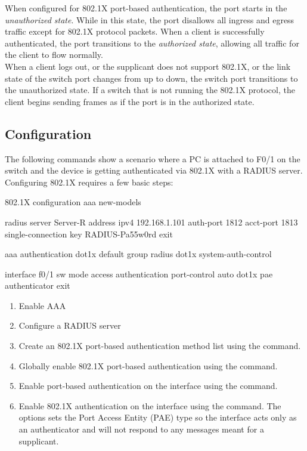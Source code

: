 When configured for 802.1X port-based authentication, the port starts in the \emph{unauthorized state}. While in this state, the port disallows all ingress and egress traffic except for 802.1X protocol packets. When a client is successfully authenticated, the port transitions to the \emph{authorized state}, allowing all traffic for the client to flow normally. \\

When a client logs out, or the supplicant does not support 802.1X, or the link state of the switch port changes from up to down, the switch port transitions to the unauthorized state. If a switch that is not running the 802.1X protocol, the client begins sending frames as if the port is in the authorized state.\\


\subsection{Configuration}

The following commands show a scenario where a PC is attached to F0/1 on the switch and the device is getting authenticated via 802.1X with a RADIUS server. Configuring 802.1X requires a few basic steps:

\begin{sexylisting}{802.1X configuration}
aaa new-models

radius server Server-R
  address ipv4 192.168.1.101 auth-port 1812 acct-port 1813
  single-connection
  key RADIUS-Pa55w0rd
  exit
 
aaa authentication dot1x default group radius
dot1x system-auth-control

interface f0/1
  sw mode access
  authentication port-control auto
  dot1x pae authenticator
  exit
\end{sexylisting}

\begin{enumerate}
\item Enable AAA 
\item Configure a RADIUS server
\item Create an 802.1X port-based authentication method list using the  command.
\item Globally enable 802.1X port-based authentication using the  command.
\item Enable port-based authentication on the interface using the  command.
\item Enable 802.1X authentication on the interface using the  command. The  options sets the Port Access Entity (PAE) type so the interface acts only as an authenticator and will not respond to any messages meant for a supplicant.
\end{enumerate}

